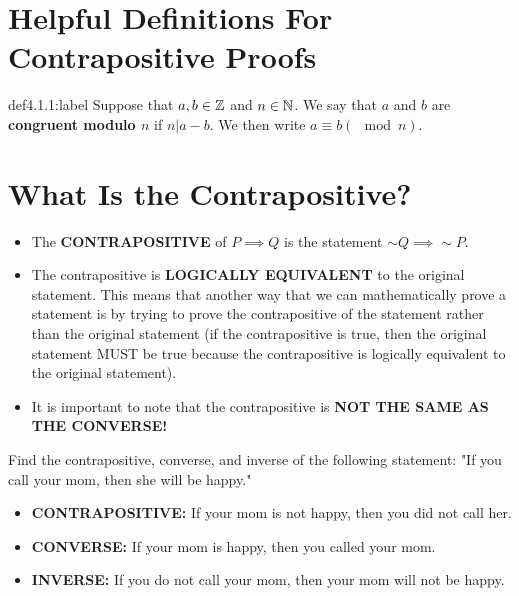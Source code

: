 \section{Helpful Definitions For Contrapositive Proofs}

\begin{definition}{def4.1.1:label}
    Suppose that $a,b\in\mathbb{Z}$ and $n\in\mathbb{N}$. We say that $a$ and $b$ are \textbf{congruent modulo $n$} if $n|a-b$. We then write $a\equiv b(\mod n)$.
\end{definition}


\section{What Is the Contrapositive?}

\begin{itemize}
	\item The \textbf{CONTRAPOSITIVE} of $P \implies Q$ is the statement $\sim Q \implies \sim P$.\\

	\item The contrapositive is \textbf{LOGICALLY EQUIVALENT} to the original statement. This means that another way that we can mathematically prove a statement is by trying to prove the contrapositive of the statement rather than the original statement (if the contrapositive is true, then the original statement MUST be true because the contrapositive is logically equivalent to the original statement).\\
	
	\item It is important to note that the contrapositive is \textbf{NOT THE SAME AS THE CONVERSE!}
\end{itemize}

\begin{problem}
	Find the contrapositive, converse, and inverse of the following statement: "If you call your mom, then she will be happy."\\

	\begin{itemize}
		\item \textbf{CONTRAPOSITIVE:} If your mom is not happy, then you did not call her.
		\item \textbf{CONVERSE:} If your mom is happy, then you called your mom.
		\item \textbf{INVERSE:} If you do not call your mom, then your mom will not be happy.
	\end{itemize}
\end{problem}


